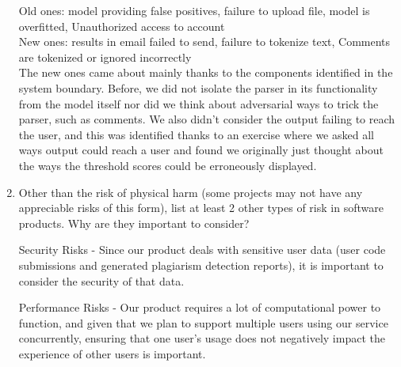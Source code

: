 \documentclass{article}
\begin{document}
\begin{enumerate}
    Old ones: model providing false positives, failure to upload file, 
    model is overfitted, Unauthorized access to account
    \\
    New ones: results in email failed to send, failure to tokenize text, 
    Comments are tokenized or ignored incorrectly
    \\
    The new ones came about mainly thanks to the components identified in the 
    system boundary. Before, we did not isolate the parser in its functionality 
    from the model itself nor did we think about adversarial ways to trick the 
    parser, such as comments. We also didn't consider the output failing to 
    reach the user, and this was identified thanks to an exercise where we 
    asked all ways output could reach a user and found we originally just
    thought about the ways the threshold scores could be erroneously displayed.
    

    \item Other than the risk of physical harm (some projects may not have any
    appreciable risks of this form), list at least 2 other types of risk in
    software products. Why are they important to consider?

    Security Risks - Since our product deals with sensitive user data (user code
    submissions and generated plagiarism detection reports), it is important to
    consider the security of that data.

    Performance Risks - Our product requires a lot of computational power to function,
    and given that we plan to support multiple users using our service concurrently, ensuring
    that one user's usage does not negatively impact the experience of other users is important.


\end{enumerate}
\end{document}
